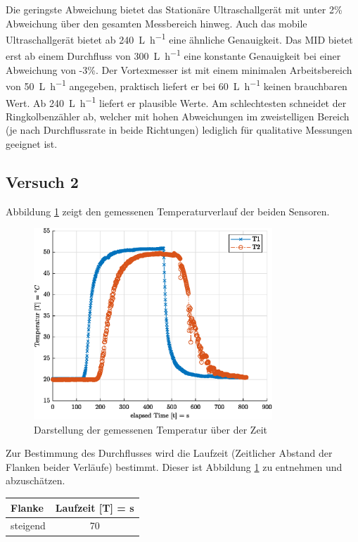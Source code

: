 Die geringste Abweichung bietet das Stationäre Ultraschallgerät mit unter 2\% Abweichung über den gesamten Messbereich hinweg. Auch das mobile Ultraschallgerät bietet ab \SI{240}{\liter\per\hour} eine ähnliche Genauigkeit. Das MID bietet erst ab einem Durchfluss von \SI{300}{\liter\per\hour} eine konstante Genauigkeit bei einer Abweichung von -3\%. Der Vortexmesser ist mit einem minimalen Arbeitsbereich von \SI{50}{\liter\per\hour} angegeben, praktisch liefert er bei \SI{60}{\liter\per\hour} keinen brauchbaren Wert. Ab \SI{240}{\liter\per\hour} liefert er plausible Werte. Am schlechtesten schneidet der Ringkolbenzähler ab, welcher mit hohen Abweichungen im zweistelligen Bereich (je nach Durchflussrate in beide Richtungen) lediglich für qualitative Messungen geeignet ist.

\subsection{Versuch 2}


Abbildung \ref{fig:temp} zeigt den gemessenen Temperaturverlauf der beiden Sensoren.

\begin{figure}[H]
	\centering
	\includegraphics[width=0.8\textwidth]{../DATA/tempPlot.eps}
	\caption[]{Darstellung der gemessenen Temperatur über der Zeit}
	\label{fig:temp}
\end{figure}

Zur Bestimmung des Durchflusses wird  die Laufzeit (Zeitlicher Abstand der Flanken beider Verläufe) bestimmt. Dieser ist Abbildung \ref{fig:temp} zu entnehmen und abzuschätzen.

\begin{center}
	\begin{tabular}{l|c}
		\label{tab:}
		
		\textbf{Flanke} & \textbf{Laufzeit} [T] = s\\
		\hline
		steigend & 70 
	\end{tabular}
\end{center}

